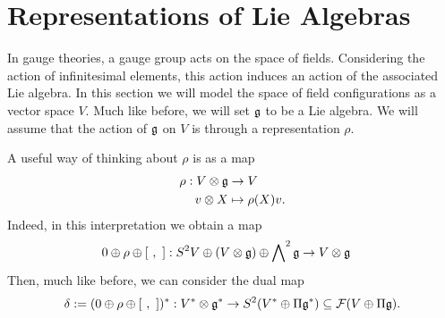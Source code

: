 \section{Representations of Lie Algebras}

In gauge theories, a gauge group acts on the space of fields. Considering the action of infinitesimal elements, this action induces an action of the associated Lie algebra. In this section we will model the space of field configurations as a vector space $V$. Much like before, we will set $\mathfrak{g}$ to be a Lie algebra. We will assume that the action of $\mathfrak{g}$ on $V$ is through a representation $\rho$.

A useful way of thinking about $\rho$ is as a map
\begin{equation}
\begin{aligned}
\rho:V\otimes\mathfrak{g}&\rightarrow V\\
v\otimes X&\mapsto \rho(X)v.
\end{aligned}
\end{equation}
Indeed, in this interpretation we obtain a map
\begin{equation}
\begin{aligned}
0\oplus\rho\oplus\left[~,~\right]:S^2V\oplus(V\otimes\mathfrak{g})\oplus\bigwedge\nolimits^2\mathfrak{g}&\rightarrow V\otimes\mathfrak{g}
\end{aligned}
\end{equation}
Then, much like before, we can consider the dual map
\begin{equation}
\delta:=(0\oplus\rho\oplus\left[~,~\right])^*:V^*\otimes\mathfrak{g}^*\rightarrow S^2(V^*\oplus\Pi\mathfrak{g}^*)\subseteq\mathcal{F}(V\oplus\Pi \mathfrak{g}).
\end{equation}

